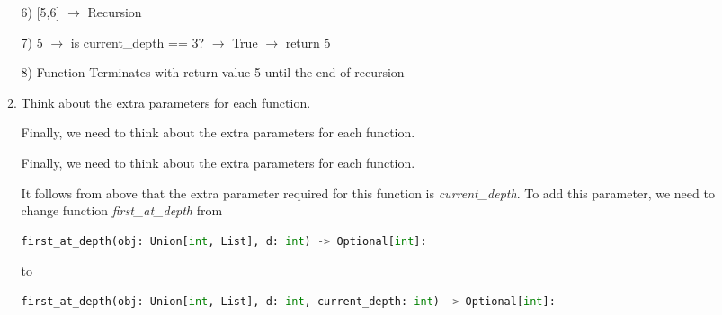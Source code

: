 \documentclass[12pt]{article}
\begin{document}
\begin{enumerate}[a.]
\begin{mdframed}
\begin{enumerate}[1.]
\begin{mdframed}
\begin{mdframed}
                \hspace{10mm} 6) [5,6] $\to$ Recursion

                \bigskip

                \hspace{10mm} \hspace{10mm} 7) 5 $\to$ is current\_depth == 3? $\to$ True $\to$ return 5

                \bigskip

                8) Function Terminates with return value 5 until the end of recursion

            \end{mdframed}
            \end{mdframed}

            \item Think about the extra parameters for each function.

            \bigskip

            Finally, we need to think about the extra parameters for each function.

            \bigskip

            \begin{mdframed}

            Finally, we need to think about the extra parameters for each function.

            \bigskip

            It follows from above that the extra parameter required for this function is
            \textit{current\_depth}. To add this parameter, we need to change function
            \textit{first\_at\_depth} from

            \begin{lstlisting}[language=python,keepspaces=false]
            first_at_depth(obj: Union[int, List], d: int) -> Optional[int]:
            \end{lstlisting}

            to

            \begin{lstlisting}[language=python,keepspaces=false]
            first_at_depth(obj: Union[int, List], d: int, current_depth: int) -> Optional[int]:
            \end{lstlisting}

            \end{mdframed}
        \end{enumerate}

        \bigskip


\end{mdframed}
\end{enumerate}
\end{document}
